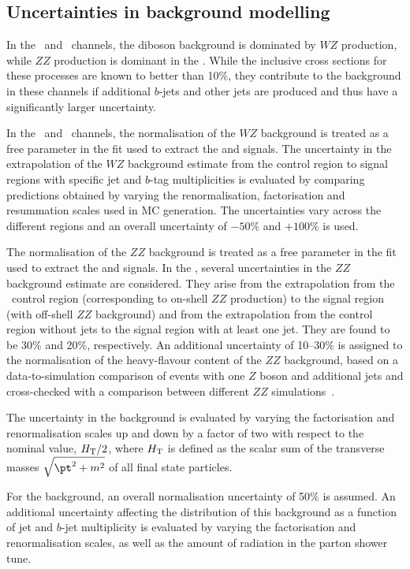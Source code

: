 \subsection{Uncertainties in background modelling}
\label{sec:bkg_modeling}

In the \TL\ and \SSLSR\ channels, the diboson background is dominated by $WZ$
production, while $ZZ$ production is dominant in the \FLC.  While the inclusive
cross sections for these processes are known to better than 10\%, they
contribute to the background in these channels if additional $b$-jets and 
other jets are produced and thus have a significantly larger uncertainty.

In the \TL\ and \SSLSR\ channels, the normalisation of the $WZ$ background is
treated as a free parameter in the fit used to extract the \ttZ and \ttW signals. The
uncertainty in the extrapolation of the $WZ$ background estimate from the
control region to signal regions with specific jet and $b$-tag multiplicities
is evaluated by comparing predictions obtained by varying the renormalisation,
factorisation and resummation scales used in MC generation. The
uncertainties vary across the different regions and an overall uncertainty of
$-50\%$ and $+100\%$ is used.

The normalisation of the $ZZ$ background is treated as a free parameter in the
fit used to extract the \ttZ and \ttW signals.  In the \FLC, several uncertainties in
the $ZZ$ background estimate are considered.  They arise from the extrapolation
from the \FLCR\ control region (corresponding to on-shell $ZZ$ production) to
the signal region (with off-shell $ZZ$ background) and from the extrapolation
from the control region without jets to the signal region with at least one
jet. They are found to be 30\% and 20\%, respectively.  An additional
uncertainty of 10--30\% is assigned to the normalisation of the heavy-flavour
content of the $ZZ$ background, based on a data-to-simulation comparison of
events with one $Z$ boson and additional jets and cross-checked with a
comparison between different $ZZ$ simulations~\cite{TOPQ-2013-05}.

The uncertainty in the \ttH background is evaluated by varying the factorisation and renormalisation scales up and down by a factor of two with respect to the nominal value, $H_{\rm T}/2$, where $H_{\rm T}$ is defined as the scalar sum of the transverse masses $\sqrt{\pt^2+m^2}$ of all final state particles.

For the \tZ background, an overall normalisation uncertainty of 50\% is
assumed.  An additional uncertainty affecting the distribution of this
background as a function of jet and $b$-jet multiplicity is evaluated by
varying the factorisation and renormalisation scales, as well as the amount of
radiation in the  parton shower tune.

